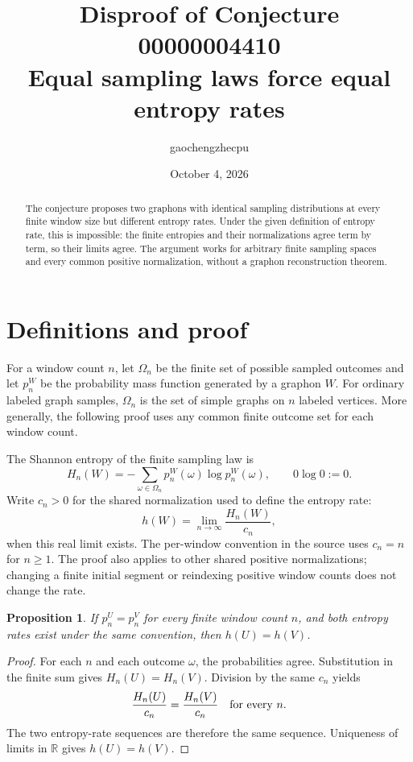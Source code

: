 \documentclass[11pt]{article}
\title{Disproof of Conjecture 00000004410\\\large Equal sampling laws force equal entropy rates}
\author{gaochengzhecpu}
\date{October 4, 2026}
\newtheorem{proposition}{Proposition}
\begin{document}
\maketitle
\begin{abstract}
The conjecture proposes two graphons with identical sampling distributions
at every finite window size but different entropy rates. Under the given
definition of entropy rate, this is impossible: the finite entropies and
their normalizations agree term by term, so their limits agree. The argument
works for arbitrary finite sampling spaces and every common positive
normalization, without a graphon reconstruction theorem.
\end{abstract}

\section*{Definitions and proof}
For a window count $n$, let $\Omega_n$ be the finite set of possible sampled
outcomes and let $p_n^W$ be the probability mass function generated by a
graphon $W$. For ordinary labeled graph samples, $\Omega_n$ is the set of
simple graphs on $n$ labeled vertices. More generally, the following proof
uses any common finite outcome set for each window count.

The Shannon entropy of the finite sampling law is
\[
 H_n(W)=-\sum_{\omega\in\Omega_n}
       p_n^W(\omega)\log p_n^W(\omega),\qquad 0\log0:=0.
\]
Write $c_n>0$ for the shared normalization used to define the entropy rate:
\[
                       h(W)=\lim_{n\to\infty}\frac{H_n(W)}{c_n},
\]
when this real limit exists. The per-window convention in the source uses
$c_n=n$ for $n\geq1$. The proof also applies to other shared positive
normalizations; changing a finite initial segment or reindexing positive
window counts does not change the rate.

\begin{proposition}
If $p_n^U=p_n^V$ for every finite window count $n$, and both entropy rates
exist under the same convention, then $h(U)=h(V)$.
\end{proposition}
\begin{proof}
For each $n$ and each outcome $\omega$, the probabilities agree. Substitution
in the finite sum gives $H_n(U)=H_n(V)$. Division by the same $c_n$ yields
\[
                         \frac{H_n(U)}{c_n}=\frac{H_n(V)}{c_n}
                         \quad\hbox{for every }n.
\]
The two entropy-rate sequences are therefore the same sequence. Uniqueness
of limits in $\mathbb R$ gives $h(U)=h(V)$.
\end{proof}
\end{document}
